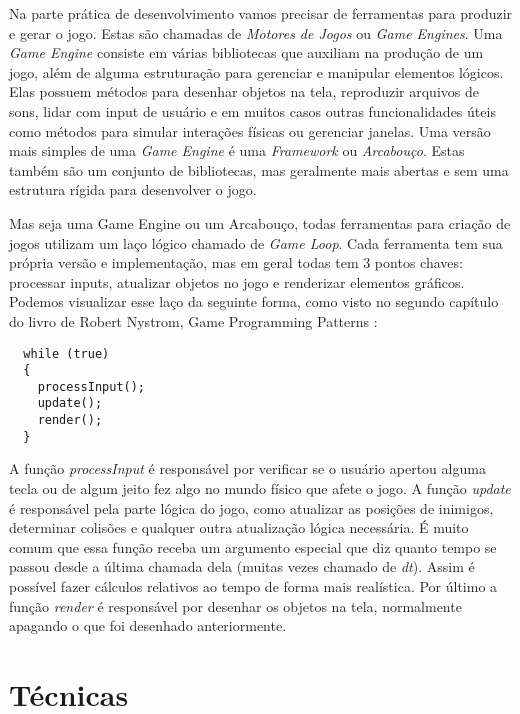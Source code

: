 Na parte prática de desenvolvimento vamos precisar de ferramentas para produzir e gerar o jogo. Estas são chamadas de \textit{Motores de Jogos} ou \textit{Game Engines}. Uma \textit{Game Engine} consiste em várias bibliotecas que auxiliam na produção de um jogo, além de alguma estruturação para gerenciar e manipular elementos lógicos. Elas possuem métodos para desenhar objetos na tela, reproduzir arquivos de sons, lidar com input de usuário e em muitos casos outras funcionalidades úteis como métodos para simular interações físicas ou gerenciar janelas. Uma versão mais simples de uma \textit{Game Engine} é uma \textit{Framework} ou \textit{Arcabouço}. Estas também são um conjunto de bibliotecas, mas geralmente mais abertas e sem uma estrutura rígida para desenvolver o jogo.

Mas seja uma Game Engine ou um Arcabouço, todas ferramentas para criação de jogos utilizam um laço lógico chamado de \textit{Game Loop}. Cada ferramenta tem sua própria versão e implementação, mas em geral todas tem 3 pontos chaves: processar inputs, atualizar objetos no jogo e renderizar elementos gráficos. Podemos visualizar esse laço da seguinte forma, como visto no segundo capítulo do livro de Robert Nystrom, Game Programming Patterns \cite{robertgameloop}:

\begin{lstlisting}
  while (true)
  {
    processInput();
    update();
    render();
  }
\end{lstlisting}

A função \textit{processInput} é responsável por verificar se o usuário apertou alguma tecla ou de algum jeito fez algo no mundo físico que afete o jogo. A função \textit{update} é responsável pela parte lógica do jogo, como atualizar as posições de inimigos, determinar colisões e qualquer outra atualização lógica necessária. É muito comum que essa função receba um argumento especial que diz quanto tempo se passou desde a última chamada dela (muitas vezes chamado de \textit{dt}). Assim é possível fazer cálculos relativos ao tempo de forma mais realística. Por último a função \textit{render} é responsável por desenhar os objetos na tela, normalmente apagando o que foi desenhado anteriormente.


\section{Técnicas}
\label{sec:tecnicas}

